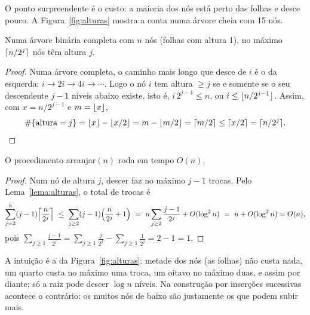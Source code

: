 O ponto surpreendente é o custo: a maioria dos nós está perto das folhas e desce pouco. A Figura~\ref{fig:alturas} mostra a conta numa árvore cheia com 15 nós.
\begin{figura}[Numa árvore completa, metade dos nós são folhas e não descem nada; um quarto desce no máximo um nível; e assim por diante. Com 15 nós, o \emph{arranjar} faz no máximo $4\cdot1+2\cdot2+1\cdot3=11$ trocas, menos que $n$.\label{fig:alturas}]
\end{figura}

\begin{lema}\label{lema:alturas}
Numa árvore binária completa com $n$ nós (folhas com altura 1), no máximo $\lceil n/2^j\rceil$ nós têm altura $j$.
\end{lema}
\begin{proof}
Numa árvore completa, o caminho mais longo que desce de $i$ é o da esquerda: $i\to2i\to4i\to\cdots$. Logo o nó $i$ tem altura $\ge j$ se e somente se o seu descendente $j-1$ níveis abaixo existe, isto é, $i\,2^{j-1}\le n$, ou $i\le\lfloor n/2^{j-1}\rfloor$. Assim, com $x=n/2^{j-1}$ e $m=\lfloor x\rfloor$,
\[
\#\{\text{altura}=j\}=\lfloor x\rfloor-\lfloor x/2\rfloor=m-\lfloor m/2\rfloor=\lceil m/2\rceil\le\lceil x/2\rceil=\lceil n/2^j\rceil.\qedhere
\]
\end{proof}

\begin{teo}
O procedimento arranjar$(n)$ roda em tempo $O(n)$.
\end{teo}
\begin{proof}
Num nó de altura $j$, descer faz no máximo $j-1$ trocas. Pelo Lema~\ref{lema:alturas}, o total de trocas é
\[
\sum_{j=2}^{h}(j-1)\ceil*{\frac{n}{2^j}}\ \le\ \sum_{j\ge2}(j-1)\Bigl(\frac{n}{2^j}+1\Bigr)
\ =\ n\sum_{j\ge2}\frac{j-1}{2^j}+O(\log^2 n)\ =\ n+O(\log^2n)=O(n),
\]
pois $\sum_{j\ge1}\frac{j-1}{2^j}=\sum_{j\ge1}\frac{j}{2^j}-\sum_{j\ge1}\frac1{2^j}=2-1=1$.
\end{proof}
A intuição é a da Figura~\ref{fig:alturas}: metade dos nós (as folhas) não custa nada, um quarto custa no máximo uma troca, um oitavo no máximo duas, e assim por diante; só a raiz pode descer $\log n$ níveis. Na construção por inserções sucessivas acontece o contrário: os muitos nós de baixo são justamente os que podem subir mais.

